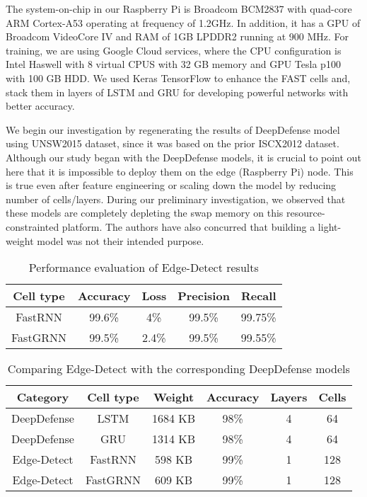 \documentclass[conference]{IEEEtran}
\newcommand{\magenta}[1]{{\color{magenta}{#1}}}
\begin{document}
\noindent The system-on-chip in our Raspberry Pi is Broadcom BCM2837 with quad-core ARM Cortex-A53 operating at frequency of 1.2GHz. In addition, it has a GPU of Broadcom VideoCore IV and RAM of 1GB LPDDR2 running at 900 MHz. For training, we are using Google Cloud services, where the CPU configuration is Intel Haswell with 8 virtual CPUS with 32 GB memory and GPU Tesla p100 with 100 GB HDD. We used Keras TensorFlow \cite{tensorflow2015-whitepaper} to enhance the FAST cells and, stack them in layers of LSTM and GRU for developing powerful networks with better accuracy. 

\iffalse
\magenta{Details about GPU and software that we have used.} \\
SoC: Broadcom BCM2837
CPU: 4× ARM Cortex-A53, 1.2GHz
GPU: Broadcom VideoCore IV
RAM: 1GB LPDDR2 (900 MHz)
\fi



We begin our investigation by regenerating the results of DeepDefense model \cite{yuan2017deepdefense} using UNSW2015 dataset, since it was based on the prior ISCX2012 dataset. 
Although  our study began with the DeepDefense models, it is crucial to point out here that it is impossible to deploy them on the edge (Raspberry Pi) node. This is true even after feature engineering or scaling down the model by reducing number of cells/layers. 
During our preliminary investigation, we observed that these models are completely depleting the swap memory on this resource-constrainted platform. The authors have also concurred that building a light-weight model was not their intended purpose. 

\begin{table}[]
\caption{Performance evaluation of Edge-Detect results}
    \label{Table:results-edd}
    \centering
\begin{tabular}{|c|c|c|c|c|}
\hline
\textbf{Cell type}&\textbf{Accuracy}&\textbf{Loss}&\textbf{Precision}&\textbf{Recall} 
\\ \hline
FastRNN     & 99.6\%    & 4\%   & 99.5\%    & 99.75\%
\\ \hline
FastGRNN    & 99.5\%    & 2.4\% & 99.5\%    & 99.55\%
\\ \hline
\end{tabular}
\end{table}

\begin{table}[]
\caption{Comparing Edge-Detect with the  corresponding DeepDefense models}
    \label{Table:compare-dd-edd}
    \centering
\begin{tabular}{|c|c|c|c|c|c|}
\hline
\textbf{Category}&\textbf{Cell type}&\textbf{Weight}&\textbf{Accuracy}&\textbf{Layers}&\textbf{Cells}\\
\hline
DeepDefense & LSTM     & 1684 KB & 98\%  & 4     & 64  \\
\hline
DeepDefense & GRU      & 1314 KB & 98\%  & 4     & 64  \\
\hline
Edge-Detect  & FastRNN  & 598 KB & 99\%   & 1     & 128 \\
\hline
Edge-Detect  & FastGRNN & 609 KB & 99\%   & 1     & 128 \\
\hline
    \end{tabular}
\end{table}
\end{document}
